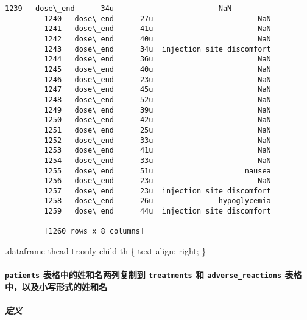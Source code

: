 \documentclass[11pt]{article}
\begin{document}
\begin{Verbatim}[commandchars=\\\{\}]
         1239   dose\_end      34u                        NaN  
         1240   dose\_end      27u                        NaN  
         1241   dose\_end      41u                        NaN  
         1242   dose\_end      40u                        NaN  
         1243   dose\_end      34u  injection site discomfort  
         1244   dose\_end      36u                        NaN  
         1245   dose\_end      40u                        NaN  
         1246   dose\_end      23u                        NaN  
         1247   dose\_end      45u                        NaN  
         1248   dose\_end      52u                        NaN  
         1249   dose\_end      39u                        NaN  
         1250   dose\_end      42u                        NaN  
         1251   dose\_end      25u                        NaN  
         1252   dose\_end      33u                        NaN  
         1253   dose\_end      41u                        NaN  
         1254   dose\_end      33u                        NaN  
         1255   dose\_end      51u                     nausea  
         1256   dose\_end      23u                        NaN  
         1257   dose\_end      23u  injection site discomfort  
         1258   dose\_end      26u               hypoglycemia  
         1259   dose\_end      44u  injection site discomfort  
         
         [1260 rows x 8 columns]
\end{Verbatim}
            
    .dataframe thead tr:only-child th \{ text-align: right; \}

    \hypertarget{patients-ux8868ux683cux4e2dux7684ux59d3ux548cux540dux4e24ux5217ux590dux5236ux5230-treatments-ux548c-adverse_reactions-ux8868ux683cux4e2dux4ee5ux53caux5c0fux5199ux5f62ux5f0fux7684ux59d3ux548cux540d}{%
\paragraph{\texorpdfstring{\texttt{patients} 表格中的姓和名两列复制到
\texttt{treatments} 和 \texttt{adverse\_reactions}
表格中，以及小写形式的姓和名}{patients 表格中的姓和名两列复制到 treatments 和 adverse\_reactions 表格中，以及小写形式的姓和名}}\label{patients-ux8868ux683cux4e2dux7684ux59d3ux548cux540dux4e24ux5217ux590dux5236ux5230-treatments-ux548c-adverse_reactions-ux8868ux683cux4e2dux4ee5ux53caux5c0fux5199ux5f62ux5f0fux7684ux59d3ux548cux540d}}

\hypertarget{ux5b9aux4e49}{%
\subparagraph{定义}\label{ux5b9aux4e49}}
\end{document}
